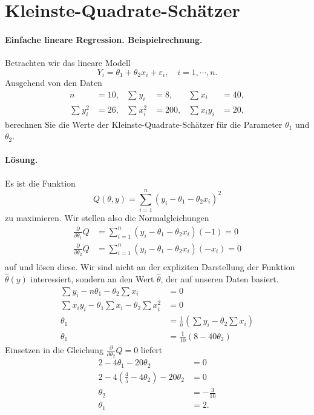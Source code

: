 \section{Kleinste-Quadrate-Schätzer}


\paragraph{Einfache lineare Regression. Beispielrechnung.} Betrachten wir das
lineare Modell
\begin{equation*}
    Y_i = \theta_1 + \theta_2 x_i + \varepsilon_i, \quad i=1,\cdots, n.
\end{equation*}
Ausgehend von den Daten
\begin{align*}
    n &=10, & \sum_{}^{} y_i &= 8, & \sum_{}^{} x_i &= 40,  \\
    \sum_{}^{} y_i^2 &= 26, & \sum_{}^{} x_i^2 &= 200, 
    & \sum_{}^{} x_i y_i &= 20,
\end{align*}
berechnen Sie die Werte der Kleinste-Quadrate-Schätzer für die Parameter
$\theta_1$ und $\theta_2$. 

\paragraph*{Lösung.} Es ist die Funktion
\begin{equation*}
    Q(\theta,y) = \sum_{i=1}^{n} \left( y_i -\theta_1 -\theta_2 x_i \right)^2
\end{equation*}
zu maximieren. Wir stellen also die Normalgleichungen
\begin{align*}
    \frac{\partial}{\partial \theta_1} Q &= 
    \sum_{i=1}^{n} \left( y_i-\theta_1-\theta_2 x_i \right) (-1) =0 \\
    \frac{\partial}{\partial \theta_2} Q &= 
    \sum_{i=1}^{n} \left( y_i-\theta_1-\theta_2 x_i \right) (-x_i) =0\\
\end{align*}
auf und lösen diese. Wir sind nicht an der expliziten Darstellung der Funktion
$\hat \theta(y)$ interessiert, sondern an den Wert $\hat\theta$, der auf
unseren Daten basiert. 
\begin{align*}
    \sum y_i - n \theta_1 -\theta_2 \sum x_i &= 0 \\
    \sum x_i y_i -\theta_1 \sum x_i -\theta_2 \sum x_i^2 &=0 \\
    \theta_1 &= \frac{1}{n} \left( \sum y_i - \theta_2 \sum x_i \right) \\
    \theta_1 &= \frac{1}{10} \left( 8 - 40 \theta_2 \right) 
\end{align*}
Einsetzen in die Gleichung $\frac{\partial}{\partial \theta_2}Q=0$ liefert
\begin{align*}
    2 - 4\theta_1 - 20\theta_2 &=0 \\
    2 - 4\left( \frac{4}{5}-4\theta_2 \right)- 20 \theta_2 &=0 \\
    \theta_2 &= -\frac{3}{10} \\
    \theta_1 &= 2.
\end{align*}


